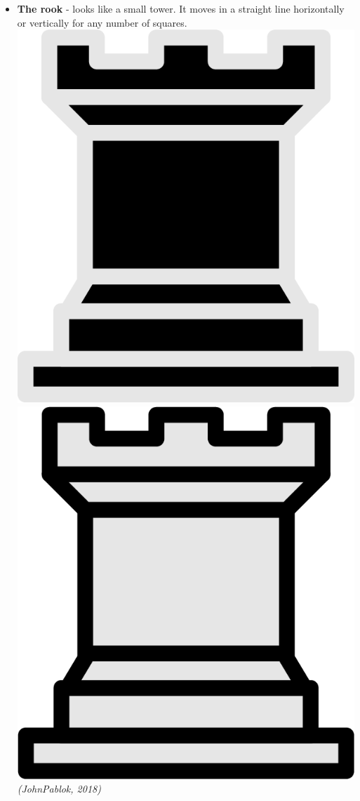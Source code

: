 \documentclass{article}
\begin{document}
\begin{itemize}
    \item \textbf{The rook} - looks like a small tower. It moves in a straight line horizontally or vertically for any number of squares. \\
    \includegraphics[scale=0.1]{image3.png}
    \includegraphics[scale=0.1]{image7.png}
    \textit{(JohnPablok, 2018)}
    

\end{itemize}
\end{document}
